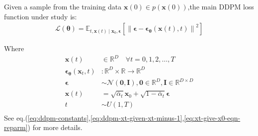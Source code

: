 \documentclass[11pt]{article}
\begin{document}
    Given a sample from the training data $\mathbf{x}(0) \in p(\mathbf{x}(0))$,the main DDPM loss function under study is:
    \begin{equation}
        \begin{aligned}
            \mathcal{L}(\bm{\theta}) =\mathbb{E}_{t,\mathbf{x}(t) \mid \mathbf{x}_0,
            \boldsymbol{\epsilon}}\left[\left\|\boldsymbol{\epsilon}-\boldsymbol{\epsilon}_
                {\bm{\theta}}\left(\mathbf{x}(t), t\right)\right\|^2\right]
        \end{aligned}
        \label{eq:ddpm-loss-simple-repeated}
    \end{equation}

    Where
    \begin{align*}
        \mathbf{x}(t) &\in \mathbb{R}^D \quad \forall t=0,1,2,\dots,T\\
        \boldsymbol{\epsilon}_{\bm{\theta}}\left(\mathbf{x}_t, t\right) &: \mathbb{R}^{D} \times \mathbb{R} \rightarrow \mathbb{R}^{D}\\
        \bm{\epsilon} &\sim \mathcal{N}(\mathbf{0},\mathbf{I}),\mathbf{0} \in \mathbb{R}^D, \mathbf{I} \in \mathbb{ R}^{D \times D} \\
        \mathbf{x}(t) &=\sqrt{\bar{\alpha}_t} \mathbf{x}_0+\sqrt{1-\bar{\alpha}_t} \boldsymbol{\epsilon}\\
        t &\sim U(1,T)\\
    \end{align*}
    See eq.(\ref{eq:ddpm-constants},\ref{eq:ddpm-xt-given-xt-minus-1},\ref{eq:xt-give-x0-eqn-reparm}) for more details.


\end{document}
